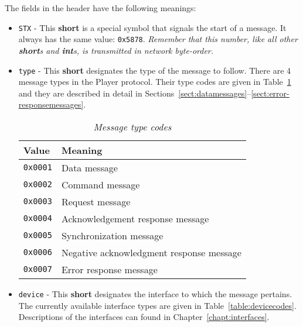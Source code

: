 \documentclass[11pt]{report}
\begin{document}
The fields in the header have the following meanings:
\begin{itemize}
\item {\tt STX} - This {\bf short} is a special symbol that signals the start
of a message.  It always has the same value: {\tt 0x5878}.
{\em Remember that this number, like all other {\bf short}s and
{\bf int}s, is transmitted in network byte-order.}

\item {\tt type} - This {\bf short} designates the type of the message to 
follow.  There are 4 message types in the Player protocol. 
Their type codes are given in Table~\ref{table:messagetypes} and they
are described in detail in 
Sections~\ref{sect:datamessages}--\ref{sect:error-responsemessages}.

\begin{table}[ht]
\begin{center}
{\small
\begin{tabular}{|l|l|}
\hline
{\bf Value} & {\bf Meaning} \\
\hline
{\tt 0x0001} & Data message\\
\hline
{\tt 0x0002} & Command message\\
\hline
{\tt 0x0003} & Request message\\
\hline
{\tt 0x0004} & Acknowledgement response message\\
\hline
{\tt 0x0005} & Synchronization message\\
\hline
{\tt 0x0006} & Negative acknowledgment response message\\
\hline
{\tt 0x0007} & Error response message\\
\hline
\end{tabular}
}
\end{center}
\caption{{\em Message type codes}}
\label{table:messagetypes}
\end{table}

\item {\tt device} - This {\bf short} designates the interface to which
the message pertains.  The currently available interface types are given
in Table~\ref{table:devicecodes}.  Descriptions of the interfaces can found
in Chapter~\ref{chapt:interfaces}.


\end{itemize}
\end{document}
